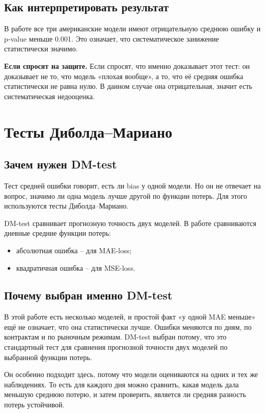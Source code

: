 \documentclass[11pt,a4paper]{article}
\newcommand{\answer}[1]{%
  \vspace{0.15em}
  \noindent\colorbox{softgreen}{%
    \parbox{\dimexpr\linewidth-2\fboxsep\relax}{\textbf{Если спросят на защите.} #1}%
  }\vspace{0.2em}
}
\begin{document}
\subsection{Как интерпретировать результат}

В работе все три американские модели имеют отрицательную среднюю ошибку и p-value меньше 0.001. Это означает, что систематическое занижение статистически значимо.

\answer{Если спросят, что именно доказывает этот тест: он доказывает не то, что модель «плохая вообще», а то, что её средняя ошибка статистически не равна нулю. В данном случае она отрицательная, значит есть систематическая недооценка.}

\section{Тесты Диболда--Мариано}

\subsection{Зачем нужен DM-test}

Тест средней ошибки говорит, есть ли bias у одной модели. Но он не отвечает на вопрос, значимо ли одна модель лучше другой по функции потерь. Для этого используются тесты Диболда--Мариано.

DM-test сравнивает прогнозную точность двух моделей. В работе сравниваются дневные средние функции потерь:

\begin{itemize}
    \item абсолютная ошибка -- для MAE-loss;
    \item квадратичная ошибка -- для MSE-loss.
\end{itemize}

\subsection{Почему выбран именно DM-test}

В этой работе есть несколько моделей, и простой факт «у одной MAE меньше» ещё не означает, что она статистически лучше. Ошибки меняются по дням, по контрактам и по рыночным режимам. DM-test выбран потому, что это стандартный тест для сравнения прогнозной точности двух моделей по выбранной функции потерь.

Он особенно подходит здесь, потому что модели оцениваются на одних и тех же наблюдениях. То есть для каждого дня можно сравнить, какая модель дала меньшую среднюю потерю, и затем проверить, является ли средняя разность потерь устойчивой.
\end{document}
